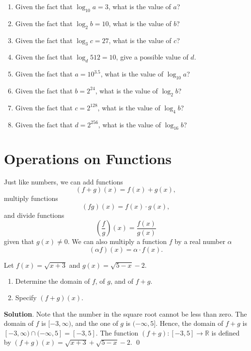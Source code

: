 \documentclass[11pt]{book}
\theoremstyle{break}
\theoremstyle{no_label}
\newcommand{\bbR}{\mathbb{R}}
\numberwithin{equation}{section}
\begin{document}
\begin{enumerate}[label=\arabic*.]
    \item Given the fact that $\log_{10}a=3$, what is the value of $a$?
    \item Given the fact that $\log_{2}b=10$, what is the value of $b$?
    \item Given the fact that $\log_{3}c=27$, what is the value of $c$?
    \item Given the fact that $\log_{d}512=10$, give a possible value of $d$.
    \item Given the fact that $a=10^{3.5}$, what is the value of $\log_{10}a$?
    \item Given the fact that $b=2^{24}$, what is the value of $\log_{2}b$?
    \item Given the fact that $c=2^{128}$, what is the value of $\log_{4}b$?
    \item Given the fact that $d=2^{256}$, what is the value of $\log_{16}b$?
    
\end{enumerate}


\section{Operations on Functions}

\setlength{\delimitershortfall}{0pt}

Just like numbers, we can add functions $$(f+g)(x)=f(x)+g(x),$$ multiply functions $$(fg)(x)=f(x)\cdot g(x),$$ and divide functions $$\left(\dfrac{f}{g}\right)(x)=\dfrac{f(x)}{g(x)}$$ given that $g(x)\ne 0$. We can also multiply a function $f$ by a real number $\alpha$ $$(\alpha f)(x)=\alpha\cdot f(x).$$

\setlength{\delimitershortfall}{13.5pt}

\begin{example}
    Let $f(x)=\sqrt{x+3}$ and $g(x)=\sqrt{5-x}-2$.
    \begin{enumerate}
        \item Determine the domain of $f$, of $g$, and of $f+g$.
        \item Specify $(f+g)(x)$.
    \end{enumerate}
\end{example}
\textbf{Solution}. Note that the number in the square root cannot be less than zero. The domain of $f$ is $[-3, \infty)$, and the one of $g$ is $(-\infty, 5]$. Hence, the domain of $f+g$ is $[-3, \infty)\cap(-\infty, 5]=[-3, 5]$. The function $(f+g):[-3, 5]\to\bbR$ is defined by $(f+g)(x)=\sqrt{x+3}+\sqrt{5-x}-2$. \qed
\end{document}
